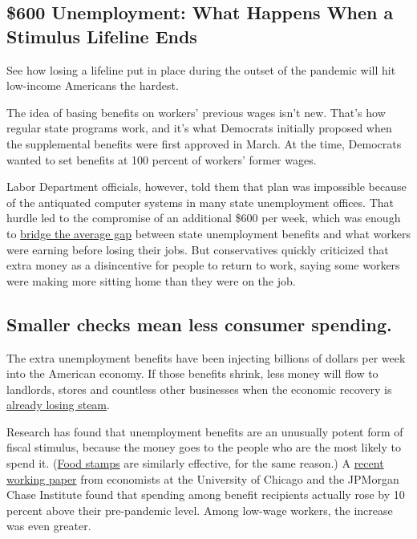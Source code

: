 \hypertarget{600-unemployment-what-happens-when-a-stimulus-lifeline-ends}{%
\subsection{\$600 Unemployment: What Happens When a Stimulus Lifeline
Ends}\label{600-unemployment-what-happens-when-a-stimulus-lifeline-ends}}

See how losing a lifeline put in place during the outset of the pandemic
will hit low-income Americans the hardest.

The idea of basing benefits on workers' previous wages isn't new. That's
how regular state programs work, and it's what Democrats initially
proposed when the supplemental benefits were first approved in March. At
the time, Democrats wanted to set benefits at 100 percent of workers'
former wages.

Labor Department officials, however, told them that plan was impossible
because of the antiquated computer systems in many state unemployment
offices. That hurdle led to the compromise of an additional \$600 per
week, which was enough to
\href{https://www.nytimes3xbfgragh.onion/interactive/2020/04/23/business/economy/unemployment-benefits-stimulus-coronavirus.html}{bridge
the average gap} between state unemployment benefits and what workers
were earning before losing their jobs. But conservatives quickly
criticized that extra money as a disincentive for people to return to
work, saying some workers were making more sitting home than they were
on the job.

\hypertarget{smaller-checks-mean-less-consumer-spending}{%
\subsection{Smaller checks mean less consumer
spending.}\label{smaller-checks-mean-less-consumer-spending}}

The extra unemployment benefits have been injecting billions of dollars
per week into the American economy. If those benefits shrink, less money
will flow to landlords, stores and countless other businesses when the
economic recovery is
\href{https://www.nytimes3xbfgragh.onion/2020/07/15/business/economy/economic-recovery-coronavirus-resurgence.html}{already
losing steam}.

Research has found that unemployment benefits are an unusually potent
form of fiscal stimulus, because the money goes to the people who are
the most likely to spend it.
(\href{https://www.nytimes3xbfgragh.onion/2020/07/17/your-money/food-stamps-coronavirus.html}{Food
stamps} are similarly effective, for the same reason.) A
\href{https://institute.jpmorganchase.com/institute/research/labor-markets/report-consumption-effects-of-unemployment-insurance-during-the-covid-19-pandemic}{recent
working paper} from economists at the University of Chicago and the
JPMorgan Chase Institute found that spending among benefit recipients
actually rose by 10 percent above their pre-pandemic level. Among
low-wage workers, the increase was even greater.

